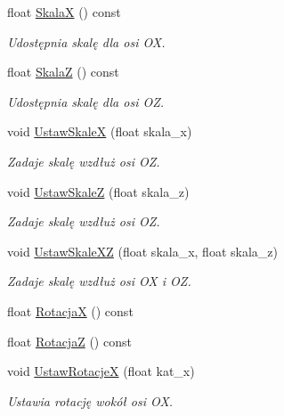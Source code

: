 \begin{DoxyCompactItemize}
float \hyperlink{class_pz_g_1_1_lacze_do_g_n_u_plota_a4b1eb252fd785a5aeff938e7b2dce2b1}{SkalaX} () const
\begin{DoxyCompactList}\small\item\em Udostępnia skalę dla osi {\itshape OX}. \end{DoxyCompactList}\item 
float \hyperlink{class_pz_g_1_1_lacze_do_g_n_u_plota_a44f922ccbc508d6cd7809c669238dae3}{SkalaZ} () const
\begin{DoxyCompactList}\small\item\em Udostępnia skalę dla osi {\itshape OZ}. \end{DoxyCompactList}\item 
void \hyperlink{class_pz_g_1_1_lacze_do_g_n_u_plota_a855b8338bfe3e5d294d719f24b11090e}{Ustaw\+SkaleX} (float skala\+\_\+x)
\begin{DoxyCompactList}\small\item\em Zadaje skalę wzdłuż osi {\itshape OZ}. \end{DoxyCompactList}\item 
void \hyperlink{class_pz_g_1_1_lacze_do_g_n_u_plota_ab0486db3166d8db6580a221079af241f}{Ustaw\+SkaleZ} (float skala\+\_\+z)
\begin{DoxyCompactList}\small\item\em Zadaje skalę wzdłuż osi {\itshape OZ}. \end{DoxyCompactList}\item 
void \hyperlink{class_pz_g_1_1_lacze_do_g_n_u_plota_a4308151b54e105d302803146a3238699}{Ustaw\+Skale\+XZ} (float skala\+\_\+x, float skala\+\_\+z)
\begin{DoxyCompactList}\small\item\em Zadaje skalę wzdłuż osi {\itshape OX} i {\itshape OZ}. \end{DoxyCompactList}\item 
float \hyperlink{class_pz_g_1_1_lacze_do_g_n_u_plota_addf0b844f626f3f5220de70efcbbdbb3}{RotacjaX} () const
\item 
float \hyperlink{class_pz_g_1_1_lacze_do_g_n_u_plota_a9dac73754fab10644b287756003e9c79}{RotacjaZ} () const
\item 
void \hyperlink{class_pz_g_1_1_lacze_do_g_n_u_plota_a88324c53a70846fb6bc9d918ce21fd56}{Ustaw\+RotacjeX} (float kat\+\_\+x)
\begin{DoxyCompactList}\small\item\em Ustawia rotację wokół osi {\itshape OX}. \end{DoxyCompactList}\item 

\end{DoxyCompactItemize}
